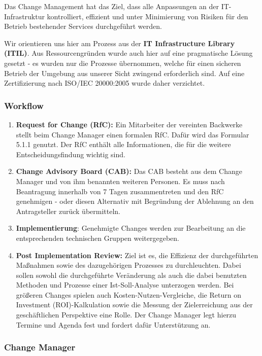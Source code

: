 \documentclass[]{article}
\begin{document}
Das Change Management hat das Ziel, dass alle Anpassungen an der
IT-Infrastruktur kontrolliert, effizient und unter Minimierung von
Risiken für den Betrieb bestehender Services durchgeführt werden.

Wir orientieren uns hier am Prozess aus der \textbf{IT Infrastructure
Library (ITIL)}. Aus Ressourcengründen wurde auch hier auf eine
pragmatische Lösung gesetzt - es wurden nur die Prozesse übernommen,
welche für einen sicheren Betrieb der Umgebung aus unserer Sicht
zwingend erforderlich sind. Auf eine Zertifizierung nach ISO/IEC
20000:2005 wurde daher verzichtet.

\subsubsection{Workflow}\label{workflow}

\begin{enumerate}
\def\labelenumi{\arabic{enumi}.}
\item
  \textbf{Request for Change (RfC):} Ein Mitarbeiter der vereinten
  Backwerke stellt beim Change Manager einen formalen RfC. Dafür wird
  das Formular 5.1.1 genutzt. Der RfC enthält alle Informationen, die
  für die weitere Entscheidungsfindung wichtig sind.
\item
  \textbf{Change Advisory Board (CAB):} Das CAB besteht aus dem Change
  Manager und von ihm benannten weiteren Personen. Es muss nach
  Beantragung innerhalb von 7 Tagen zusammentreten und den RfC
  genehmigen - oder diesen Alternativ mit Begründung der Ablehnung an
  den Antragsteller zurück übermitteln.
\item
  \textbf{Implementierung}: Genehmigte Changes werden zur Bearbeitung an
  die entsprechenden technischen Gruppen weitergegeben.
\item
  \textbf{Post Implementation Review:} Ziel ist es, die Effizienz der
  durchgeführten Maßnahmen sowie des dazugehörigen Prozesses zu
  durchleuchten. Dabei sollen sowohl die durchgeführte Veränderung als
  auch die dabei benutzten Methoden und Prozesse einer Ist-Soll-Analyse
  unterzogen werden. Bei größeren Changes spielen auch
  Kosten-Nutzen-Vergleiche, die Return on Investment (ROI)-Kalkulation
  sowie die Messung der Zielerreichung aus der geschäftlichen
  Perspektive eine Rolle. Der Change Manager legt hierzu Termine und
  Agenda fest und fordert dafür Unterstützung an.
\end{enumerate}

\subsubsection{Change Manager}\label{change-manager}
\end{document}
